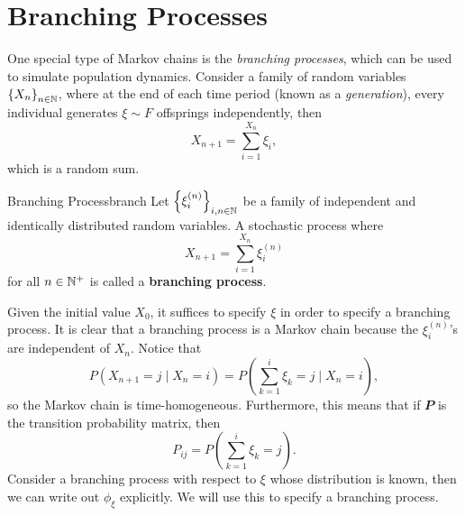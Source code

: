 \documentclass[math, code]{amznotes}
\theoremstyle{remark}
\begin{document}
\section{Branching Processes}
One special type of Markov chains is the \textit{branching processes}, which can be used to simulate population dynamics. Consider a family of random variables $\left\{X_n\right\}_{n \in \mathbb{N}}$, where at the end of each time period (known as a \textit{generation}), every individual generates $\xi \sim F$ offsprings independently, then 
\begin{equation*}
    X_{n + 1} = \sum_{i = 1}^{X_n}\xi_i,
\end{equation*}
which is a random sum.
\begin{dfnbox}{Branching Process}{branch}
    Let $\left\{\xi_i^{(n)}\right\}_{i, n \in \mathbb{N}}$ be a family of independent and identically distributed random variables. A stochastic process where 
    \begin{equation*}
        X_{n + 1} = \sum_{i = 1}^{X_n}\xi_i^{(n)}
    \end{equation*}
    for all $n \in \mathbb{N}^+$ is called a {\color{red} \textbf{branching process}}.
\end{dfnbox}
Given the initial value $X_0$, it suffices to specify $\xi$ in order to specify a branching process. It is clear that a branching process is a Markov chain because the $\xi_i^{(n)}$'s are independent of $X_n$. Notice that 
\begin{equation*}
    P\left(X_{n + 1} = j \mid X_n = i\right) = P\left(\sum_{k = 1}^{i}\xi_k = j\mid X_n = i\right),
\end{equation*}
so the Markov chain is time-homogeneous. Furthermore, this means that if $\mathbfit{P}$ is the transition probability matrix, then 
\begin{equation*}
    P_{ij} = P\left(\sum_{k = 1}^{i}\xi_k = j\right).
\end{equation*}
Consider a branching process with respect to $\xi$ whose distribution is known, then we can write out $\phi_{\xi}$ explicitly. We will use this to specify a branching process.
\end{document}
